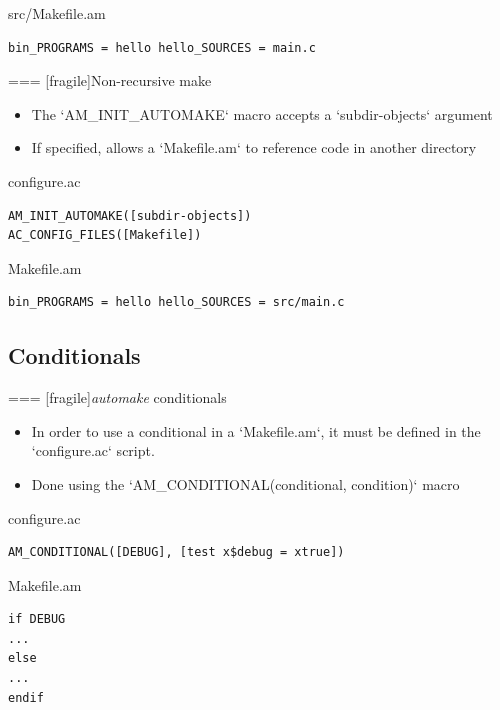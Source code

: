   \begin{block}{src/Makefile.am}
\begin{verbatim}
bin_PROGRAMS = hello hello_SOURCES = main.c
\end{verbatim}
  \end{block}


=== [fragile]{Non-recursive make}

  \begin{itemize}
  \item The `AM_INIT_AUTOMAKE` macro accepts a
    `subdir-objects` argument
  \item If specified, allows a `Makefile.am` to reference code in
    another directory
  \end{itemize}

\begin{block}{configure.ac}
\begin{verbatim}
AM_INIT_AUTOMAKE([subdir-objects])
AC_CONFIG_FILES([Makefile])
\end{verbatim}
\end{block}

\begin{block}{Makefile.am}
\begin{verbatim}
bin_PROGRAMS = hello hello_SOURCES = src/main.c
\end{verbatim}
\end{block}



\subsection{Conditionals}

=== [fragile]{{\em automake} conditionals}

  \begin{itemize}
  \item In order to use a conditional in a `Makefile.am`, it must
    be defined in the `configure.ac` script.
  \item Done using the `AM_CONDITIONAL(conditional, condition)`
    macro
  \end{itemize}

  \begin{block}{configure.ac}
\begin{verbatim}
AM_CONDITIONAL([DEBUG], [test x$debug = xtrue])
\end{verbatim}
  \end{block}

  \begin{block}{Makefile.am}
\begin{verbatim}
if DEBUG
...
else
...
endif
\end{verbatim}
  \end{block}



